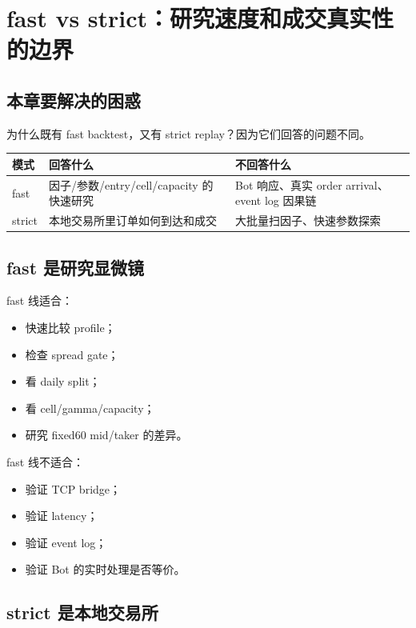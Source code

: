 \chapter{fast vs strict：研究速度和成交真实性的边界}

\section{本章要解决的困惑}

为什么既有 fast backtest，又有 strict replay？因为它们回答的问题不同。

\begin{longtable}{p{}p{}p{}}
\toprule
模式 & 回答什么 & 不回答什么 \\
\midrule
fast & 因子/参数/entry/cell/capacity 的快速研究 & Bot 响应、真实 order arrival、event log 因果链 \\
strict & 本地交易所里订单如何到达和成交 & 大批量扫因子、快速参数探索 \\
\bottomrule
\end{longtable}

\section{fast 是研究显微镜}

fast 线适合：

\begin{itemize}[leftmargin=2em]
  \item 快速比较 profile；
  \item 检查 spread gate；
  \item 看 daily split；
  \item 看 cell/gamma/capacity；
  \item 研究 fixed60 mid/taker 的差异。
\end{itemize}

fast 线不适合：

\begin{itemize}[leftmargin=2em]
  \item 验证 TCP bridge；
  \item 验证 latency；
  \item 验证 event log；
  \item 验证 Bot 的实时处理是否等价。
\end{itemize}

\section{strict 是本地交易所}

